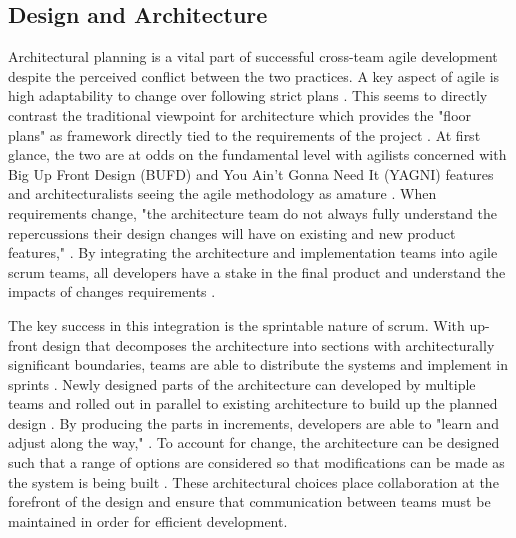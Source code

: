\subsection{Design and Architecture}
Architectural planning is a vital part of successful cross-team agile development despite the perceived conflict between the two practices.
A key aspect of agile is high adaptability to change over following strict plans \cite{AgileMani}.
This seems to directly contrast the traditional viewpoint for architecture which provides the "floor plans" as framework directly tied to the requirements of the project \cite{perry1992foundations}.
At first glance, the two are at odds on the fundamental level with agilists concerned with Big Up Front Design (BUFD) and You Ain't Gonna Need It (YAGNI) features and architecturalists seeing the agile methodology as amature \cite{kruchten2010software}.
When requirements change, "the architecture team do not always fully understand the repercussions their design changes will have on existing and new product features," \cite{isham2008agile}.
By integrating the architecture and implementation teams into agile scrum teams, all developers have a stake in the final product and understand the impacts of changes requirements \cite{isham2008agile}.


The key success in this integration is the sprintable nature of scrum.
With up-front design that decomposes the architecture into sections with architecturally significant boundaries, teams are able to distribute the systems and implement in sprints \cite{madison2010agile}.
Newly designed parts of the architecture can developed by multiple teams and rolled out in parallel to existing architecture to build up the planned design \cite{isham2008agile}.
By producing the parts in increments, developers are able to "learn and adjust along the way," \cite{isham2008agile}.
To account for change, the architecture can be designed such that a range of options are considered so that modifications can be made as the system is being built \cite{madison2010agile}.
These architectural choices place collaboration at the forefront of the design and ensure that communication between teams must be maintained in order for efficient development.
